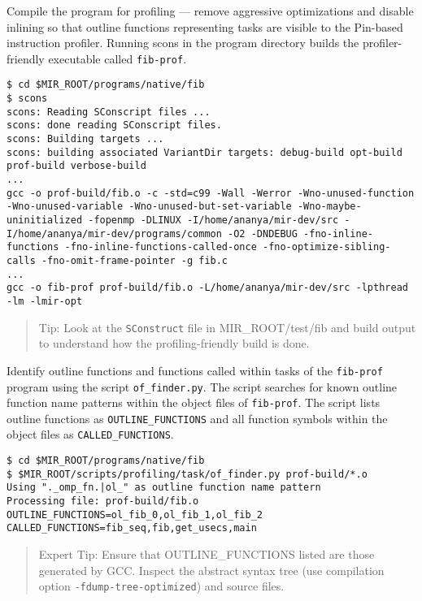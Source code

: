 \documentclass[11pt,a4paper]{article}
\begin{document}
Compile the program for profiling ---  remove aggressive optimizations and disable inlining so that outline functions representing tasks are visible to the Pin-based instruction profiler. Running scons in the program directory builds the profiler-friendly executable called \texttt{fib-prof}.  

\begin{lstlisting}[style=MyInputStyle]
$ cd $MIR_ROOT/programs/native/fib
$ scons 
scons: Reading SConscript files ...
scons: done reading SConscript files.
scons: Building targets ...
scons: building associated VariantDir targets: debug-build opt-build prof-build verbose-build
...
gcc -o prof-build/fib.o -c -std=c99 -Wall -Werror -Wno-unused-function -Wno-unused-variable -Wno-unused-but-set-variable -Wno-maybe-uninitialized -fopenmp -DLINUX -I/home/ananya/mir-dev/src -I/home/ananya/mir-dev/programs/common -O2 -DNDEBUG -fno-inline-functions -fno-inline-functions-called-once -fno-optimize-sibling-calls -fno-omit-frame-pointer -g fib.c
...
gcc -o fib-prof prof-build/fib.o -L/home/ananya/mir-dev/src -lpthread -lm -lmir-opt
\end{lstlisting}
    
\begin{framed}
\begin{quote}
Tip: Look at the \texttt{SConstruct} file in MIR\_ROOT/test/fib and build output to understand how the profiling-friendly build is done.
\end{quote}
\end{framed}

Identify outline functions and functions called within tasks of the \texttt{fib-prof} program using the script \texttt{of\_finder.py}. The script searches for known outline function name patterns within the object files of \texttt{fib-prof}. The script lists outline functions as \texttt{OUTLINE\_FUNCTIONS} and all function symbols within the object files as \texttt{CALLED\_FUNCTIONS}.

\begin{lstlisting}[style=MyInputStyle]
$ cd $MIR_ROOT/programs/native/fib
$ $MIR_ROOT/scripts/profiling/task/of_finder.py prof-build/*.o
Using "._omp_fn.|ol_" as outline function name pattern
Processing file: prof-build/fib.o
OUTLINE_FUNCTIONS=ol_fib_0,ol_fib_1,ol_fib_2
CALLED_FUNCTIONS=fib_seq,fib,get_usecs,main
\end{lstlisting}

\begin{framed}
\begin{quote}
Expert Tip: Ensure that OUTLINE\_FUNCTIONS listed are those generated by GCC. Inspect the abstract syntax tree (use compilation option \texttt{-fdump-tree-optimized}) and source files.
\end{quote}
\end{framed}
\end{document}
